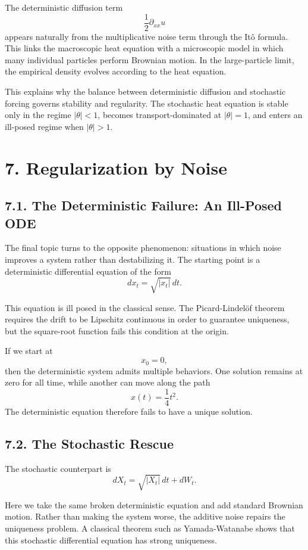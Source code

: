 \documentclass[11pt]{article}
\theoremstyle{definition}
\theoremstyle{remark}
\begin{document}
The deterministic diffusion term
\[
\frac12 \partial_{xx}u
\]
appears naturally from the multiplicative noise term through the It\^o formula. This links the macroscopic heat equation with a microscopic model in which many individual particles perform Brownian motion. In the large-particle limit, the empirical density evolves according to the heat equation.

This explains why the balance between deterministic diffusion and stochastic forcing governs stability and regularity. The stochastic heat equation is stable only in the regime \(|\theta|<1\), becomes transport-dominated at \(|\theta|=1\), and enters an ill-posed regime when \(|\theta|>1\).

\section*{7. Regularization by Noise}

\subsection*{7.1. The Deterministic Failure: An Ill-Posed ODE}
The final topic turns to the opposite phenomenon: situations in which noise improves a system rather than destabilizing it. The starting point is a deterministic differential equation of the form
\[
dx_t=\sqrt{|x_t|}\,dt.
\]

This equation is ill posed in the classical sense. The Picard-Lindel\"of theorem requires the drift to be Lipschitz continuous in order to guarantee uniqueness, but the square-root function fails this condition at the origin.

If we start at
\[
x_0=0,
\]
then the deterministic system admits multiple behaviors. One solution remains at zero for all time, while another can move along the path
\[
x(t)=\frac14 t^2.
\]
The deterministic equation therefore fails to have a unique solution.

\subsection*{7.2. The Stochastic Rescue}
The stochastic counterpart is
\[
dX_t=\sqrt{|X_t|}\,dt+dW_t.
\]

Here we take the same broken deterministic equation and add standard Brownian motion. Rather than making the system worse, the additive noise repairs the uniqueness problem. A classical theorem such as Yamada-Watanabe shows that this stochastic differential equation has strong uniqueness.
\end{document}
